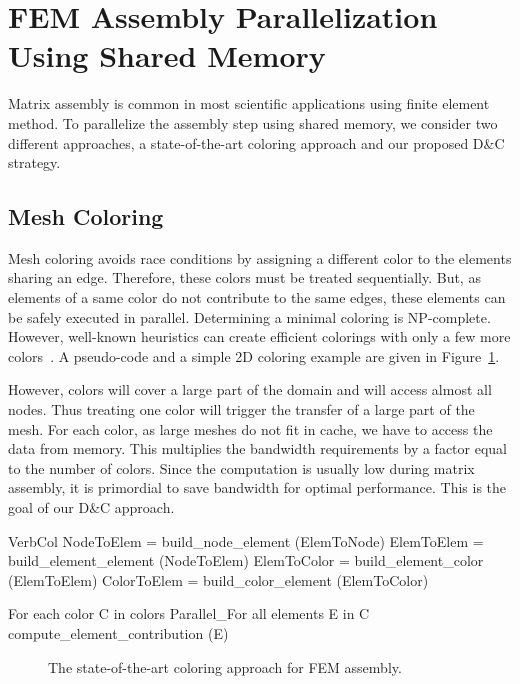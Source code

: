 \documentclass[10pt]{IOS-Book-Article}
\begin{document}
\section{FEM Assembly Parallelization Using Shared Memory}
\label{sec:assembly}

Matrix assembly is common in most scientific applications using finite element method. 
To parallelize the assembly step using shared memory, we consider two different approaches, a state-of-the-art coloring approach and our
proposed D\&C strategy.


\subsection{Mesh Coloring}
\label{sec:col}
Mesh coloring avoids race conditions by assigning a different color to the elements sharing an edge. Therefore, these colors must be treated sequentially. But, as elements of a same color do not contribute to the same edges, these elements can be safely executed in parallel.
Determining a minimal coloring is NP-complete. However, well-known heuristics can create efficient colorings
with only a few more colors~\cite{CPUfe}. A pseudo-code and a simple 2D coloring example are given in Figure~\ref{fig:colApp}.

However, colors will cover a large part of the domain and will access almost all nodes. Thus treating one color will trigger the transfer of a large part of the mesh. 
For each color, as large meshes do not fit in cache, we have to access the data from memory. This multiplies the bandwidth requirements by
a factor equal to the number of colors. Since the computation is
usually low during matrix assembly, it is primordial to save bandwidth for optimal performance. This is the goal of our D\&C approach.



\begin{SaveVerbatim}[]{VerbCol}
NodeToElem = build_node_element (ElemToNode)
ElemToElem = build_element_element (NodeToElem)
ElemToColor = build_element_color (ElemToElem)
ColorToElem = build_color_element (ElemToColor)

For each color C in colors
  Parallel_For all elements E in C
    compute_element_contribution (E)
\end{SaveVerbatim}

\begin{figure}[htp]
\caption{The state-of-the-art coloring approach for FEM assembly.}
\label{fig:colApp}
\end{figure}
\end{document}
